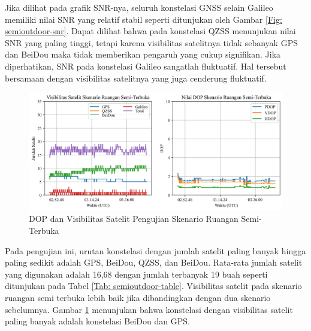 Jika dilihat pada grafik SNR-nya, seluruh konstelasi GNSS selain Galileo memiliki nilai SNR yang relatif stabil seperti ditunjukan oleh Gambar \ref{Fig: semioutdoor-snr}. Dapat dilihat bahwa pada konstelasi QZSS menunjukan nilai SNR yang paling tinggi, tetapi karena visibilitas satelitnya tidak sebanyak GPS dan BeiDou maka tidak memberikan pengaruh yang cukup signifikan. Jika diperhatikan, SNR pada konstelasi Galileo sangatlah fluktuatif. Hal tersebut bersamaan dengan visibilitas satelitnya yang juga cenderung fluktuatif.

\begin{figure}[H]
	\centering
	\captionsetup{justification=centering}
	\begin{adjustbox}{width=\textwidth}
		\includegraphics{contents/chapter-4/3-skenario-semioutdoor/sats_dop.png}
	\end{adjustbox}
	\caption{DOP dan Visibilitas Satelit Pengujian Skenario Ruangan Semi-Terbuka}
	\label{Fig: semioutdoor-sats_dop}
\end{figure}

Pada pengujian ini, urutan konstelasi dengan jumlah satelit paling banyak hingga paling sedikit adalah GPS, BeiDou, QZSS, dan BeiDou. Rata-rata jumlah satelit yang digunakan adalah 16,68 dengan jumlah terbanyak 19 buah seperti ditunjukan pada Tabel \ref{Tab: semioutdoor-table}. Visibilitas satelit pada skenario ruangan semi terbuka lebih baik jika dibandingkan dengan dua skenario sebelumnya. Gambar \ref{Fig: semioutdoor-sats_dop} menunjukan bahwa konstelasi dengan visibilitas satelit paling banyak adalah konstelasi BeiDou dan GPS.

